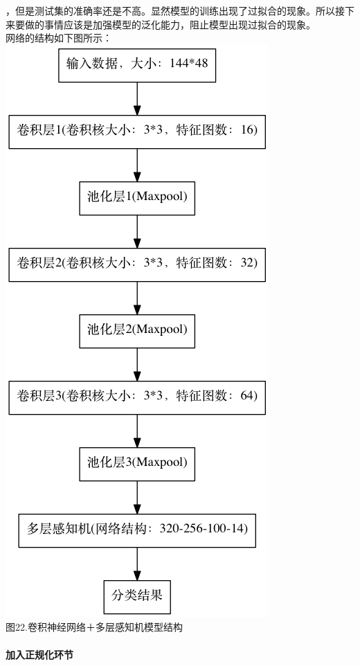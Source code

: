 ，但是测试集的准确率还是不高。显然模型的训练出现了过拟合的现象。所以接下来要做的事情应该是加强模型的泛化能力，阻止模型出现过拟合的现象。\\网络的结构如下图所示：\\\includegraphics{picture/cnn-mlp.png}\\图22.卷积神经网络＋多层感知机模型结构

\paragraph{加入正规化环节}\label{ux52a0ux5165ux6b63ux89c4ux5316ux73afux8282}

